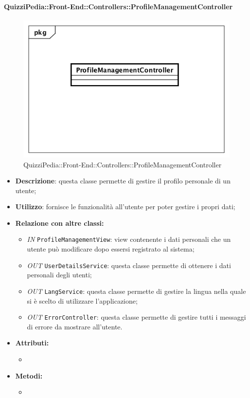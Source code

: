 \paragraph{QuizziPedia::Front-End::Controllers::ProfileManagementController}
\begin{figure}
	\centering
	\includegraphics[scale=0.45]{UML/Classi/Front-End/QuizziPedia_Front-end_Controller_ProfileManagementController.png}
	\caption{QuizziPedia::Front-End::Controllers::ProfileManagementController}
\end{figure}
\begin{itemize}
	\item \textbf{Descrizione}: questa classe permette di gestire il profilo personale di un utente; 
	\item \textbf{Utilizzo}: fornisce le funzionalità all'utente per poter gestire i propri dati;
	\item \textbf{Relazione con altre classi:}
	\begin{itemize}
		\item \textit{IN} \texttt{ProfileManagementView}: view contenente i dati personali che un utente può modificare dopo essersi registrato al sistema;
		\item \textit{OUT} \texttt{UserDetailsService}: questa classe permette di ottenere i dati personali degli utenti;
		\item \textit{OUT} \texttt{LangService}: questa classe permette di gestire la lingua nella quale si è scelto di utilizzare l'applicazione;
		\item \textit{OUT} \texttt{ErrorController}: questa classe permette di gestire tutti i messaggi di errore da mostrare all'utente.
	\end{itemize}
	\item \textbf{Attributi:}
	\begin{itemize}
		\item 
	\end{itemize}
	\item \textbf{Metodi:}
	\begin{itemize}
		\item 
	\end{itemize}
\end{itemize}

